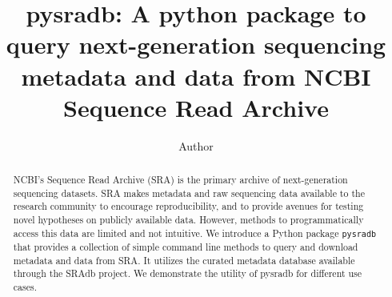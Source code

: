 \documentclass[9pt,a4paper]{extarticle}
\begin{document}
\pagestyle{front}
\title{pysradb: A python package to query next-generation sequencing metadata
and data from NCBI Sequence Read Archive}

\author[]{Author}%


\maketitle
\thispagestyle{front}


\begin{abstract}





NCBI’s Sequence Read Archive (SRA) is the primary archive of next-generation 
sequencing datasets. SRA makes metadata and raw sequencing data available to the
research community to encourage reproducibility, and to provide avenues for 
testing novel hypotheses on publicly available data. However, methods to
programmatically access this data are limited and not intuitive. We introduce a
Python package \texttt{pysradb} that provides a collection of simple command
line methods to query and download metadata and data from SRA. It utilizes the
curated metadata database available through the SRAdb project. We demonstrate 
the utility of pysradb for different use cases. 


\end{abstract}
\end{document}

